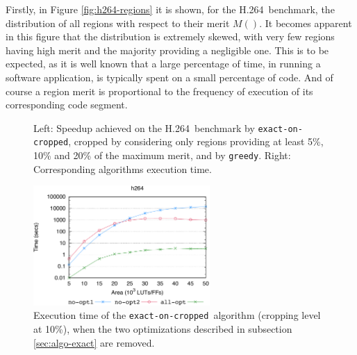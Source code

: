 \documentclass[]{usiinfthesis}
\newcommand{\htsf}{{H.264}}
\newcommand{\greedy}{\texttt{greedy}}
\newcommand{\exactC}{\texttt{exact-on-cropped}}
\begin{document}
Firstly, in Figure \ref{fig:h264-regions} it is shown, for the \htsf\
benchmark, the distribution of all regions with respect to their merit
$M()$.
It becomes apparent in this figure that the distribution is extremely
skewed, with very few regions having high merit and the majority
providing a negligible one. This is to be expected, as it is well
known that a large percentage of time, in running a software
application, is typically spent on a small percentage of code. And of
course a region merit is proportional to the frequency of execution of
its corresponding code segment.\par

\begin{figure}[t]
\centering
\hspace*{-2cm}
\hspace*{-2cm}
\caption{Left: Speedup achieved on the \htsf\ benchmark by \exactC,
  cropped by considering only regions providing at least 5\%, 10\% and
  20\% of the maximum merit, and by \greedy.  Right: Corresponding
  algorithms execution time.}
\label{fig:h264-ex-gr}
\end{figure}

\begin{figure}[h]
\centering
\includegraphics[width=0.6\textwidth]{figs/exact_versions}
\caption{Execution time of the \exactC\ algorithm (cropping
  level at 10\%), when the two optimizations described in subsection
  \ref{sec:algo-exact} are removed.  }
\label{fig:h264-exact-versions}
\end{figure}
\end{document}
